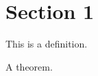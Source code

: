 \section{Section 1}

\begin{definition}
    This is a definition.
\end{definition}

\begin{theorem}
    A theorem.
\end{theorem}